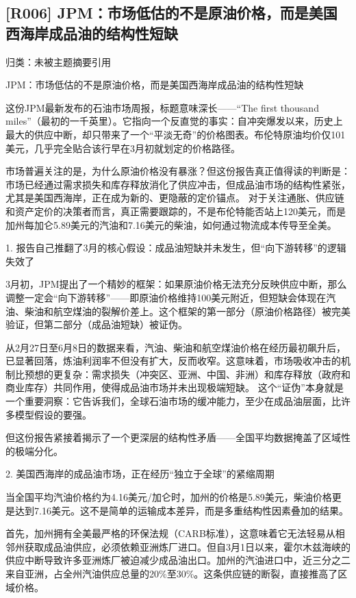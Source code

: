 \documentclass[11pt]{ctexart}
\begin{document}
\subsection{[R006] JPM：市场低估的不是原油价格，而是美国西海岸成品油的结构性短缺}
{\small\color{refgray}归类：未被主题摘要引用}

JPM：市场低估的不是原油价格，而是美国西海岸成品油的结构性短缺

这份JPM最新发布的石油市场周报，标题意味深长——“The first thousand miles”（最初的一千英里）。它指向一个反直觉的事实：自冲突爆发以来，历史上最大的供应中断，却只带来了一个“平淡无奇”的价格图表。布伦特原油均价仅101美元，几乎完全贴合该行早在3月初就划定的价格路径。

市场普遍关注的是，为什么原油价格没有暴涨？但这份报告真正值得读的判断是：市场已经通过需求损失和库存释放消化了供应冲击，但成品油市场的结构性紧张，尤其是美国西海岸，正在成为新的、更隐蔽的定价锚点。 对于关注通胀、供应链和资产定价的决策者而言，真正需要跟踪的，不是布伦特能否站上120美元，而是加州每加仑5.89美元的汽油和7.16美元的柴油，如何通过物流成本传导至全美。

1. 报告自己推翻了3月的核心假设：成品油短缺并未发生，但“向下游转移”的逻辑失效了

3月初，JPM提出了一个精妙的框架：如果原油价格无法充分反映供应中断，那么调整一定会“向下游转移”——即原油价格维持100美元附近，但短缺会体现在汽油、柴油和航空煤油的裂解价差上。这个框架的第一部分（原油价格路径）被完美验证，但第二部分（成品油短缺）被证伪。

从2月27日至6月8日的数据来看，汽油、柴油和航空煤油价格在经历最初飙升后，已显著回落，炼油利润率不但没有扩大，反而收窄。这意味着，市场吸收冲击的机制比预想的更复杂：需求损失（冲突区、亚洲、中国、非洲）和库存释放（政府和商业库存）共同作用，使得成品油市场并未出现极端短缺。 这个“证伪”本身就是一个重要洞察：它告诉我们，全球石油市场的缓冲能力，至少在成品油层面，比许多模型假设的要强。

但这份报告紧接着揭示了一个更深层的结构性矛盾——全国平均数据掩盖了区域性的极端分化。

2. 美国西海岸的成品油市场，正在经历“独立于全球”的紧缩周期

当全国平均汽油价格约为4.16美元/加仑时，加州的价格是5.89美元，柴油价格更是达到7.16美元。这不是简单的运输成本差异，而是多重结构性因素叠加的结果。

首先，加州拥有全美最严格的环保法规（CARB标准），这意味着它无法轻易从相邻州获取成品油供应，必须依赖亚洲炼厂进口。但自3月1日以来，霍尔木兹海峡的供应中断导致许多亚洲炼厂被迫减少成品油出口。加州的汽油进口中，近三分之二来自亚洲，占全州汽油供应总量的20\%至30\%。这条供应链的断裂，直接推高了区域价格。
\end{document}

